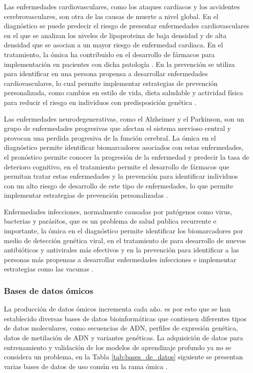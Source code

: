 Las enfermedades cardiovasculares, como los ataques cardiacos y los accidentes cerebrovasculares, son otra de las causas de muerte a nivel global. En el diagnóstico se puede predecir el riesgo de presentar enfermedades cardiovasculares en el que se analizan los niveles de lipoproteina de baja densidad y de alta densidad que se asocian a un mayor riesgo de enfermedad cardiaca. En el tratamiento, la ómica ha contribuido en el desarrollo de fármacos para implementación en pacientes con dicha patología \citep{pasha2020cardiovascular}. En la prevención se utiliza para identificar en una persona propensa a desarrollar enfermedades cardiovasculares, lo cual permite implementar estrategias de prevención personalizada, como cambios en estilo de vida, dieta saludable y actividad física para reducir el riesgo en individuos con predisposición genética \citep{wang2017detecting}.

Las enfermedades neurodegenerativas, como el Alzheimer y el Parkinson, son un grupo de enfermedades progresivas que afectan el sistema nervioso central y provocan una perdida progresiva de la función cerebral. La ómica en el diagnóstico permite identificar biomarcadores asociados con estas enfermedades, el pronóstico permite conocer la progresión de la enfermedad y predecir la tasa de deterioro cognitivo, en el tratamiento permite el desarrollo de fármacos que permitan tratar estas enfermedades y la prevención para identificar individuos con un alto riesgo de desarrollo de este tipo de enfermedades, lo que permite implementar estrategias de prevención personalizadas \citep{erdacs2021neurodegenerative}.

Enfermedades infecciones, normalmente causadas por patógenos como virus, bacterias y parásitos, que es un problema de salud publica recurrente e importante, la ómica en el diagnóstico permite identificar los biomarcadores por medio de detección genética viral, en el tratamiento de para desarrollo de nuevos antibióticos y antivirales más efectivos y en la prevención para identificar a las personas más propensas a desarrollar enfermedades infecciones e implementar estrategias como las vacunas \citep{chae2018predicting}.



\subsubsection{Bases de datos ómicos}

La producción de datos ómicos incrementa cada año. es por esto que se han establecido diversas bases de datos bioinformáticas que contienen diferentes tipos de datos moleculares, como secuencias de ADN, perfiles de expresión genética, datos de metilación de ADN y variantes genéticas. La adquisición de datos para entrenamiento y validación de los modelos de aprendizaje profundo ya no se considera un problema, en la Tabla \ref{tab:bases_de_datos} siguiente se presentan varias bases de datos de uso común en la rama ómica \citep{zhang2019deep}.

